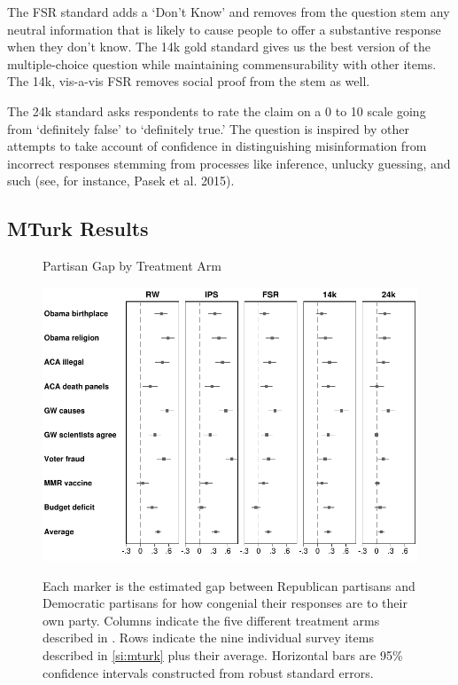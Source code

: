 \documentclass[12pt, letterpaper]{article}
\begin{document}
The FSR standard adds a `Don't Know’ and removes from the question stem any neutral information that is likely to cause people to offer a substantive response when they don't know. The 14k gold standard gives us the best version of the multiple-choice question while maintaining commensurability with other items. The 14k, vis-a-vis FSR removes social proof from the stem as well.

The 24k standard asks respondents to rate the claim on a 0 to 10 scale going from `definitely false' to `definitely true.' The question is inspired by other attempts to take account of confidence in distinguishing misinformation from incorrect responses stemming from processes like inference, unlucky guessing, and such (see, for instance, Pasek et al. 2015).

\subsection{MTurk Results}
\begin{center}
	\begin{figure}[H]
		\centering
		\caption{Partisan Gap by Treatment Arm}
		\includegraphics[scale=.8]{../figs/partisan-gap-by-item-arm.pdf}
		\label{fig:partisangaps-mturk}
		\caption*{\footnotesize 
			Each marker is the estimated gap between Republican partisans and Democratic partisans for how congenial their responses are to their own party.
			Columns indicate the five different treatment arms described in . Rows indicate the nine individual survey items described in \cref{si:mturk} plus their average.
			Horizontal bars are 95\% confidence intervals constructed from robust standard errors.
		}
	\end{figure}
\end{center}
\end{document}
